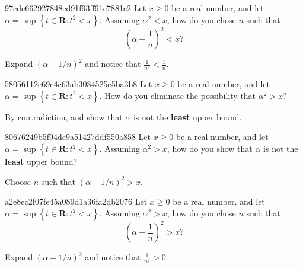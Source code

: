 \begin{note}{97cde662927848ed91f93ff91c7881e2}
    Let \({ x \geq 0 }\) be a real number, and let \({ \alpha = \sup \left\{ t \in \mathbf{R} : t^2 < x \right\} }\).
    Assuming \({ \alpha^2 < x }\), how do you chose \({ n }\) such that
    \[
            \left( \alpha + \frac{1}{n} \right)^2 < x?
    \]

    \begin{cloze}{1}
        Expand \({ \left( \alpha + 1/n \right)^2 }\) and notice that \({ \frac{1}{n^2} < \frac{1}{n} }\).
    \end{cloze}
\end{note}

\begin{note}{58056112e69c4c63ab3084525e5ba3b8}
    Let \({ x \geq 0 }\) be a real number, and let \({ \alpha = \sup \left\{ t \in \mathbf{R} : t^2 < x \right\} }\).
    How do you eliminate the possibility that \({ \alpha^2 > x }\)?

    \begin{cloze}{1}
        By contradiction, and show that \({ \alpha }\) is not the \textbf{least} upper bound.
    \end{cloze}
\end{note}

\begin{note}{80676249b5f94de9a51427ddf550a858}
    Let \({ x \geq 0 }\) be a real number, and let \({ \alpha = \sup \left\{ t \in \mathbf{R} : t^2 < x \right\} }\).
    Assuming \({ \alpha^2 > x }\), how do you show that \({ \alpha }\) is not the \textbf{least} upper bound?

    \begin{cloze}{1}
        Choose \({ n }\) such that \({ \left( \alpha - 1/n \right)^2 > x }\).
    \end{cloze}
\end{note}

\begin{note}{a2e8ec2f07fe45a089d1a36fa2db2076}
    Let \({ x \geq 0 }\) be a real number, and let \({ \alpha = \sup \left\{ t \in \mathbf{R} : t^2 < x \right\} }\).
    Assuming \({ \alpha^2 > x }\), how do you chose \({ n }\) such that
    \[
            \left( \alpha - \frac{1}{n} \right)^2 > x?
    \]

    \begin{cloze}{1}
        Expand \({ \left( \alpha - 1/n \right)^2 }\) and notice that \({ \frac{1}{n^2} > 0 }\).
    \end{cloze}
\end{note}


